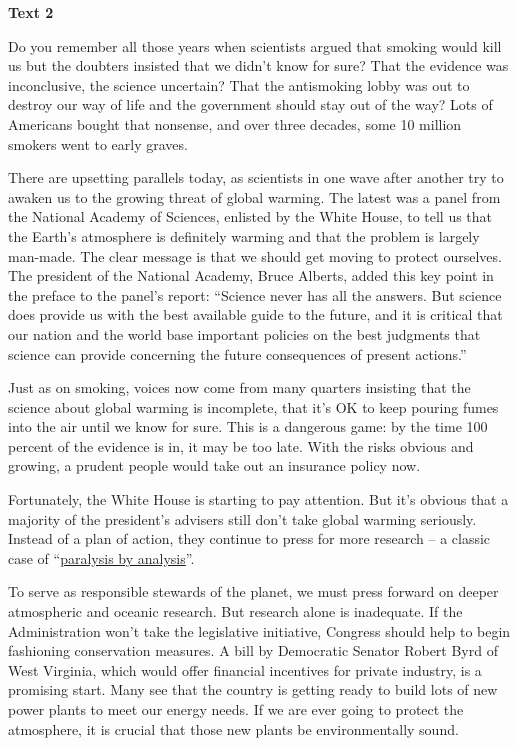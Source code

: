 \begin{center}\textbf{Text 2}\end{center}

\qquad Do you remember all those years when scientists argued that smoking would kill us but the doubters insisted that we didn't know for sure? That the evidence was inconclusive, the science uncertain? That the antismoking lobby was out to destroy our way of life and the government should stay out of the way? Lots of Americans bought that nonsense, and over three decades, some 10 million smokers went to early graves.

\qquad There are upsetting parallels today, as scientists in one wave after another try to awaken us to the growing threat of global warming. The latest was a panel from the National Academy of Sciences, enlisted by the White House, to tell us that the Earth's atmosphere is definitely warming and that the problem is largely man-made. The clear message is that we should get moving to protect ourselves. The president of the National Academy, Bruce Alberts, added this key point in the preface to the panel's report: ``Science never has all the answers. But science does provide us with the best available guide to the future, and it is critical that our nation and the world base important policies on the best judgments that science can provide concerning the future consequences of present actions.''

\qquad Just as on smoking, voices now come from many quarters insisting that the science about global warming is incomplete, that it's OK to keep pouring fumes into the air until we know for sure. This is a dangerous game: by the time 100 percent of the evidence is in, it may be too late. With the risks obvious and growing, a prudent people would take out an insurance policy now.

\qquad Fortunately, the White House is starting to pay attention. But it's obvious that a majority of the president's advisers still don't take global warming seriously. Instead of a plan of action, they continue to press for more research -- a classic case of ``\ul{paralysis by analysis}''.

\qquad To serve as responsible stewards of the planet, we must press forward on deeper atmospheric and oceanic research. But research alone is inadequate. If the Administration won't take the legislative initiative, Congress should help to begin fashioning conservation measures. A bill by Democratic Senator Robert Byrd of West Virginia, which would offer financial incentives for private industry, is a promising start. Many see that the country is getting ready to build lots of new power plants to meet our energy needs. If we are ever going to protect the atmosphere, it is crucial that those new plants be environmentally sound.

